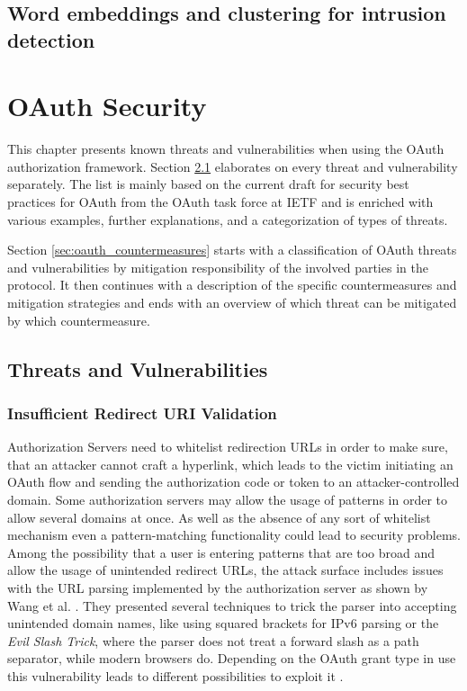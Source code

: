 \documentclass[
    fontsize=12pt,
    headings=small,
    parskip=half,           %
    bibliography=totoc,
    numbers=noenddot,       %
    open=any,               %
    ]{scrreprt}
\begin{document}
\section{Word embeddings and clustering for intrusion detection}



\chapter{OAuth Security}
\label{chap:oauth_security}

This chapter presents known threats and vulnerabilities when using the OAuth authorization framework. Section \ref{sec:oauth_threats_and_vulns} elaborates on every threat and vulnerability separately. The list is mainly based on the current draft for security best practices for OAuth from the OAuth task force at IETF and is enriched with various examples, further explanations, and a categorization of types of threats.

Section \ref{sec:oauth_countermeasures} starts with a classification of OAuth threats and vulnerabilities by mitigation responsibility of the involved parties in the protocol. It then continues with a description of the specific countermeasures and mitigation strategies and ends with an overview of which threat can be mitigated by which countermeasure.

\section{Threats and Vulnerabilities}
\label{sec:oauth_threats_and_vulns}

\subsection{Insufficient Redirect URI Validation}
\label{subsec:insufficient_redirect_uri_validation}
Authorization Servers need to whitelist redirection URLs in order to make sure, that an attacker cannot craft a hyperlink, which leads to the victim initiating an OAuth flow and sending the authorization code or token to an attacker-controlled domain. Some authorization servers may allow the usage of patterns in order to allow several domains at once. As well as the absence of any sort of whitelist mechanism even a pattern-matching functionality could lead to security problems. Among the possibility that a user is entering
patterns that are too broad and allow the usage of unintended redirect URLs, the attack surface includes issues with the URL parsing implemented by the authorization server as shown by Wang et al. \cite{wang2019make}. They presented several techniques to trick the parser into accepting unintended domain names, like using squared brackets for IPv6 parsing or the \emph{Evil Slash Trick}, where the parser does not treat a forward slash as a path
separator, while modern browsers do. Depending on the OAuth grant type in use this vulnerability leads to different possibilities to exploit it \cite{lodderstedt2020oauth}.
\end{document}
